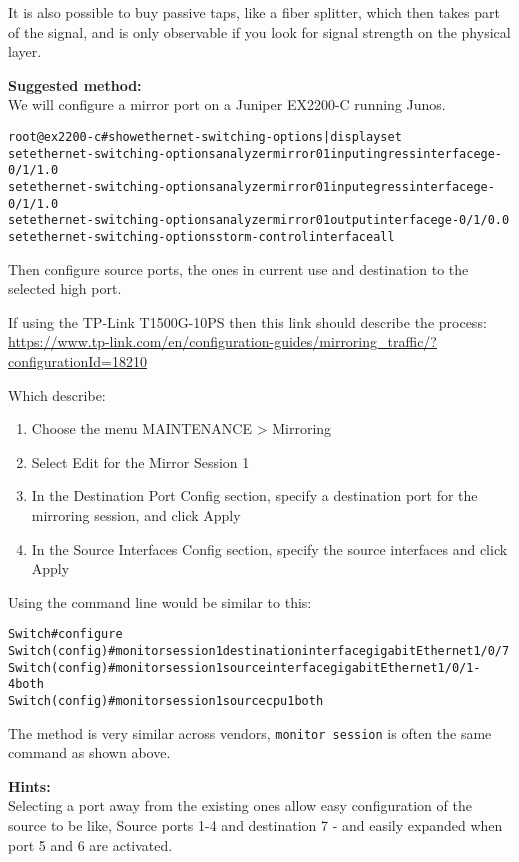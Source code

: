 \documentclass[a4paper,11pt,notitlepage]{report}
\begin{document}
It is also possible to buy passive taps, like a fiber splitter, which then takes part of the signal, and is only observable if you look for signal strength on the physical layer.


{\bf Suggested method:}\\
We will configure a mirror port on a Juniper EX2200-C running Junos.

\begin{alltt}
root@ex2200-c# show ethernet-switching-options | display set
set ethernet-switching-options analyzer mirror01 input ingress interface ge-0/1/1.0
set ethernet-switching-options analyzer mirror01 input egress interface ge-0/1/1.0
set ethernet-switching-options analyzer mirror01 output interface ge-0/1/0.0
set ethernet-switching-options storm-control interface all
\end{alltt}

Then configure source ports, the ones in current use and destination to the selected high port.

If using the TP-Link T1500G-10PS then this link should describe the process:\\
{\small\url{https://www.tp-link.com/en/configuration-guides/mirroring_traffic/?configurationId=18210}}

Which describe:
\begin{enumerate}
\item Choose the menu MAINTENANCE > Mirroring
\item Select Edit for the Mirror Session 1
\item In the Destination Port Config section, specify a destination port for the mirroring session, and click Apply
\item In the Source Interfaces Config section, specify the source interfaces and click Apply
\end{enumerate}

Using the command line would be similar to this:
\begin{alltt}
Switch#configure
Switch(config)#monitor session 1 destination interface gigabitEthernet 1/0/7
Switch(config)#monitor session 1 source interface gigabitEthernet 1/0/1-4 both
Switch(config)#monitor session 1 source cpu 1 both
\end{alltt}

The method is very similar across vendors, \verb+monitor session+ is often the same command as shown above.

{\bf Hints:}\\
Selecting a port away from the existing ones allow easy configuration of the source to be like, Source ports 1-4 and destination 7 - and easily expanded when port 5 and 6 are activated.
\end{document}
